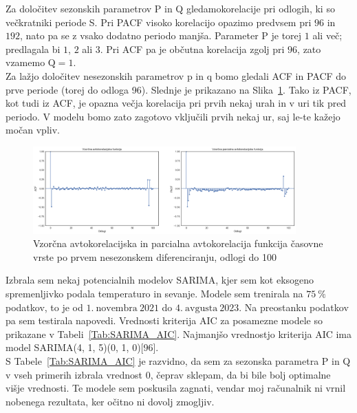 \documentclass[a4paper, 11pt]{article}
\begin{document}
\noindent Za določitev sezonskih parametrov P in Q gledamokorelacije pri odlogih, ki so večkratniki periode S. Pri
PACF visoko korelacijo opazimo predvsem pri $96$ in $192$, nato pa se z vsako dodatno periodo manjša. Parameter P je torej 
$1$ ali več; predlagala bi $1$, $2$ ali $3$. 
Pri ACF pa je občutna korelacija zgolj pri $96$, zato vzamemo $\text{Q} = 1$. \\

\noindent Za lažjo določitev nesezonskih parametrov p in q bomo gledali ACF in PACF do prve periode (torej do odloga 96). 
Slednje je prikazano na Slika~\ref{fig:ts_diff_2_acf_pacf_do_100}. Tako iz PACF, kot tudi iz ACF, je opazna večja korelacija
pri prvih nekaj urah in v uri tik pred periodo. V modelu bomo zato zagotovo vključili prvih nekaj ur, saj le-te kažejo močan vpliv.

\begin{figure}[h!]
    \caption{Vzorčna avtokorelacijska in parcialna avtokorelacija funkcija časovne vrste po prvem nesezonskem diferenciranju, odlogi do 100}\par\medskip
    \centering
    \label{fig:ts_diff_2_acf_pacf_do_100}
    \includegraphics[width=0.9\textwidth]{ts_diff_2_acf_pacf_do_100.png}
\end{figure}


\noindent Izbrala sem nekaj potencialnih modelov SARIMA, kjer sem kot eksogeno spremenljivko podala temperaturo in sevanje.
Modele sem trenirala na $75~\%$ podatkov, to je od $1.~\text{novembra}~2021$ do $4.~\text{avgusta}~2023$. Na preostanku podatkov 
pa sem testirala napovedi. 
Vrednosti kriterija AIC za posamezne modele so prikazane v Tabeli~\ref{Tab:SARIMA_AIC}. 
Najmanjšo vrednostjo kriterija AIC ima model SARIMA(4, 1, 5)(0, 1, 0)[96]. \\

\noindent S Tabele~\ref{Tab:SARIMA_AIC} je razvidno, da sem za sezonska parametra P in Q v vseh primerih izbrala 
vrednost $0$, čeprav sklepam, da bi bile bolj optimalne višje vrednosti. Te modele sem poskusila zagnati, 
vendar moj računalnik ni vrnil nobenega rezultata, ker očitno ni dovolj zmogljiv. 
\end{document}
